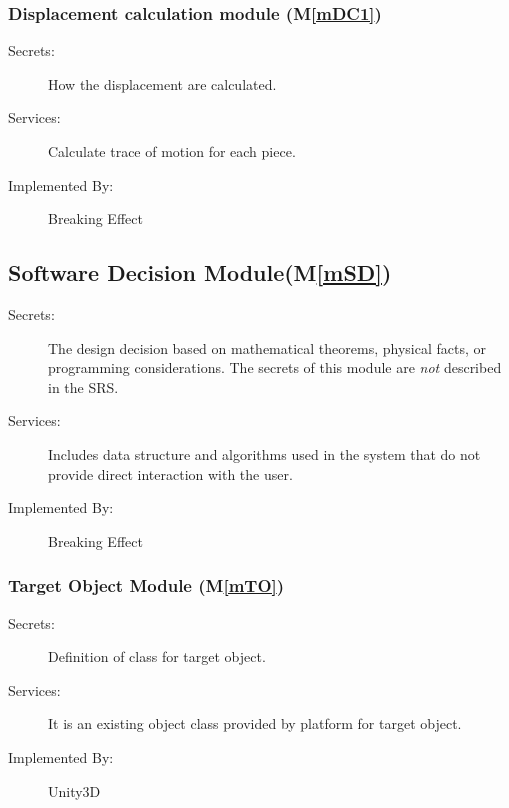 \documentclass[12pt, titlepage]{article}
\newcommand{\mref}[1]{M\ref{#1}}
\begin{document}
	\subsubsection{Displacement calculation module (\mref{mDC1})}
	
	\begin{description}
		\item[Secrets:]How the displacement are calculated.\\
		\item[Services:]Calculate trace of motion for each piece.
		\item[Implemented By:] Breaking Effect
	\end{description}
	
	\subsection{Software Decision Module(\mref{mSD})}
	
	\begin{description}
		\item[Secrets:] The design decision based on mathematical theorems, physical
		facts, or programming considerations. The secrets of this module are
		\emph{not} described in the SRS.
		\item[Services:] Includes data structure and algorithms used in the system that
		do not provide direct interaction with the user. 
		\item[Implemented By:] Breaking Effect
	\end{description}
	
	\subsubsection{Target Object Module (\mref{mTO})}
	
	\begin{description}
		\item[Secrets:]Definition of class for target object.
		\item[Services:]It is an existing object class provided by platform for target object. 
		\item[Implemented By:] Unity3D
	\end{description}
	
\end{document}
